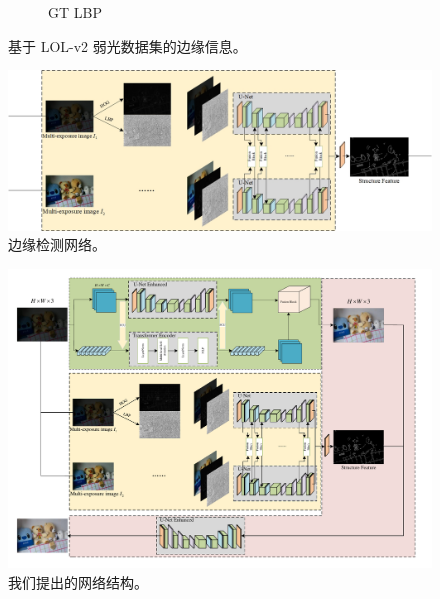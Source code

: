 \documentclass[a4paper]{ctexart}
\begin{document}
\begin{figure}[htb]
\begin{subfigure}{0.19\textwidth}
			\captionsetup{font=scriptsize}
			\caption{GT LBP}
			\label{fig: GT_lbp}	
		\end{subfigure}
		\caption{
			\label{fig: LLI Structure Information}
			基于 LOL-v2 弱光数据集的边缘信息。
		}
	\end{figure}
	\FloatBarrier

		
	
	\begin{figure}[htb]
		\centering 
		\includegraphics[width=\columnwidth]{picture/LLIE/My Architecture/Edge Detection Network}
		\caption{
			\label{fig: Edge Detection Network} 
			边缘检测网络。
		}
	\end{figure}
	\FloatBarrier
	
	\begin{figure}[htb]
		\centering 
		\includegraphics[width=\columnwidth]{picture/LLIE/My Architecture/Total architecture}
		\caption{
			\label{fig: Total Architecture} 
			我们提出的网络结构。
		}
	\end{figure}
	\FloatBarrier
	
\end{document}
